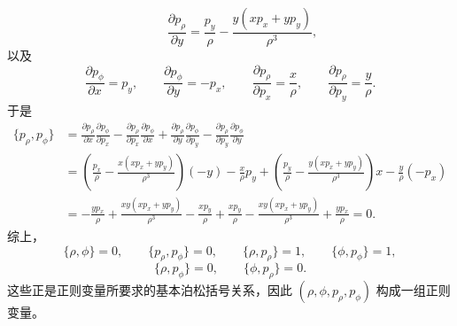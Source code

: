 \begin{solution}[正则变换例子]
\[\qquad
\frac{\partial p_\rho}{\partial y}
=
\frac{p_y}{\rho}-\frac{y(xp_x+yp_y)}{\rho^3},
\]
以及
\[
\frac{\partial p_\phi}{\partial x}=p_y,\qquad
\frac{\partial p_\phi}{\partial y}=-p_x,\qquad
\frac{\partial p_\rho}{\partial p_x}=\frac{x}{\rho},\qquad
\frac{\partial p_\rho}{\partial p_y}=\frac{y}{\rho}.
\]
于是
\[
\begin{aligned}
\{p_\rho,p_\phi\}
&=
\frac{\partial p_\rho}{\partial x}\frac{\partial p_\phi}{\partial p_x}
-\frac{\partial p_\rho}{\partial p_x}\frac{\partial p_\phi}{\partial x}
+\frac{\partial p_\rho}{\partial y}\frac{\partial p_\phi}{\partial p_y}
-\frac{\partial p_\rho}{\partial p_y}\frac{\partial p_\phi}{\partial y}\\
&=
\left(\frac{p_x}{\rho}-\frac{x(xp_x+yp_y)}{\rho^3}\right)(-y)
-\frac{x}{\rho}p_y
+\left(\frac{p_y}{\rho}-\frac{y(xp_x+yp_y)}{\rho^3}\right)x
-\frac{y}{\rho}(-p_x)\\
&=
-\frac{yp_x}{\rho}+\frac{xy(xp_x+yp_y)}{\rho^3}
-\frac{xp_y}{\rho}
+\frac{xp_y}{\rho}-\frac{xy(xp_x+yp_y)}{\rho^3}
+\frac{yp_x}{\rho}
=0.
\end{aligned}
\]
综上，
\[
\{\rho,\phi\}=0,\qquad \{p_\rho,p_\phi\}=0,\qquad
\{\rho,p_\rho\}=1,\qquad \{\phi,p_\phi\}=1,
\]
\[
\{\rho,p_\phi\}=0,\qquad \{\phi,p_\rho\}=0.
\]
这些正是正则变量所要求的基本泊松括号关系，因此 \((\rho,\phi,p_\rho,p_\phi)\) 构成一组正则变量。
\end{solution}



